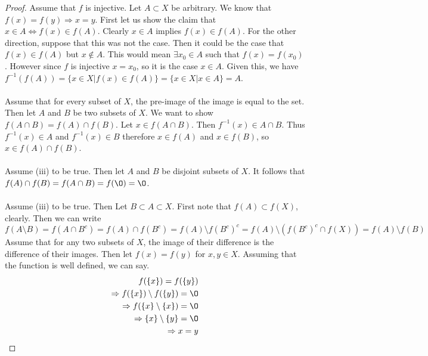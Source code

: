 \documentclass{article}
\theoremstyle{definition}
\begin{document}
    \begin{proof}
         Assume that $f$ is injective. Let $A \subset X$ be arbitrary.
        We know that $f(x) = f(y) \Longrightarrow x = y$.
        First let us show the claim that $x \in A \Leftrightarrow f(x) \in f(A)$. Clearly $x \in A$ implies $f(x) \in f(A)$.
        For the other direction, suppose that this was not the case. Then it could be the case that $f(x) \in f(A)$ but $x \notin A$.
        This would mean $\exists x_0 \in A$ such that $f(x) = f(x_0)$. However since $f$ is injective $x = x_0$, so it is the case $x \in A$.
        Given this, we have $f^{-1}(f(A)) = \{x \in X | f(x) \in f(A) \} = \{x \in X | x \in A\} = A$. \\\\
         Assume that for every subset of $X$, the pre-image of the image is equal to the set.
        Then let $A$ and $B$ be two subsets of $X$.
        We want to show $f(A \cap B) = f(A) \cap f(B)$. 
        Let $x \in f(A \cap B)$. Then $f^{-1}(x) \in A \cap B$.
        Thus $f^{-1}(x) \in A$ and $f^{-1}(x) \in B$ therefore $x \in f(A)$ and $x \in f(B)$,
        so $x \in f(A) \cap f(B)$.\\\\
        Assume (iii) to be true. Then let $A$ and $B$ be disjoint subsets of $X$. It follows that 
        $f(A) \cap f(B) = f(A \cap B) = f(\O) = \O$.\\\\
         Assume (iii) to be true. Then Let $B \subset A \subset X$.
        First note that $f(A) \subset f(X)$, clearly. Then we can write
        \[
            f(A \setminus B) = f(A \cap B^c) = f(A) \cap f(B^c) = f(A) \setminus f(B^c)^c = f(A) \setminus (f(B^c)^c \cap f(X)) = f(A) \setminus f(B)
        \]
         Assume that for any two subsets of $X$, the image of their difference is the difference of their images.
        Then let $f(x) = f(y)$ for $x,y \in X$. Assuming that the function is well defined, we can say.
        \begin{align}
            f(\{x \}) = f(\{y \}) \\
            \Rightarrow f(\{x\}) \setminus f(\{y\}) = \O \\
            \Rightarrow f(\{x\} \setminus \{x \}) = \O \\
            \Rightarrow \{x\} \setminus \{y\} = \O \\
            \Rightarrow x = y
        \end{align}
    \end{proof}
\end{document}
